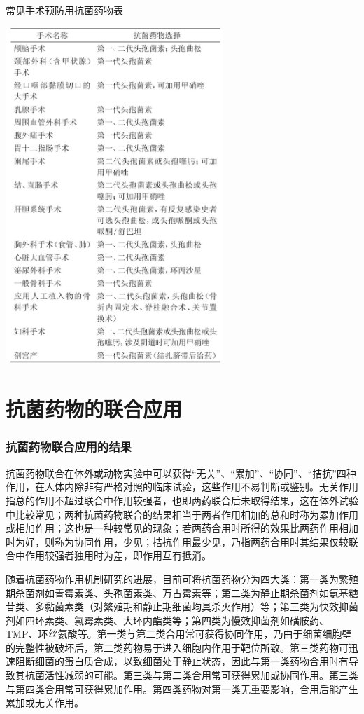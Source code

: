 \begin{table}[htbp]
\centering
\caption{常见手术预防用抗菌药物表}
\label{tab154-1}
\includegraphics[width=3.23958in,height=5.02083in]{./images/Image00587.jpg}
\end{table}



\protect\hypertarget{text00432.html}{}{}

\section{抗菌药物的联合应用}

\subsubsection{抗菌药物联合应用的结果}

抗菌药物联合在体外或动物实验中可以获得“无关”、“累加”、“协同”、“拮抗”四种作用，在人体内除非有严格对照的临床试验，这些作用不易判断或鉴别。无关作用指总的作用不超过联合中作用较强者，也即两药联合后未取得结果，这在体外试验中比较常见；两种抗菌药物联合的结果相当于两者作用相加的总和时称为累加作用或相加作用；这也是一种较常见的现象；若两药合用时所得的效果比两药作用相加时为好，则称为协同作用，少见；拮抗作用最少见，乃指两药合用时其结果仅较联合中作用较强者独用时为差，即作用互有抵消。

随着抗菌药物作用机制研究的进展，目前可将抗菌药物分为四大类：第一类为繁殖期杀菌剂如青霉素类、头孢菌素类、万古霉素等；第二类为静止期杀菌剂如氨基糖苷类、多黏菌素类（对繁殖期和静止期细菌均具杀灭作用）等；第三类为快效抑菌剂如四环素类、氯霉素类、大环内酯类等；第四类为慢效抑菌剂如磺胺药、TMP、环丝氨酸等。第一类与第二类合用常可获得协同作用，乃由于细菌细胞壁的完整性被破坏后，第二类药物易于进入细胞内作用于靶位所致。第三类药物可迅速阻断细菌的蛋白质合成，以致细菌处于静止状态，因此与第一类药物合用时有导致其抗菌活性减弱的可能。第三类与第二类合用常可获得累加或协同作用。第三类与第四类合用常可获得累加作用。第四类药物对第一类无重要影响，合用后能产生累加或无关作用。

